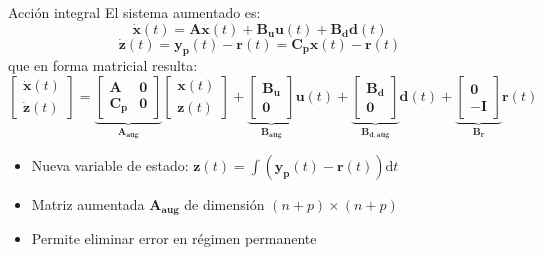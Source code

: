\documentclass{beamer}
\begin{document}
\begin{frame}{Acción integral}
    El sistema aumentado es:
    $$\mathbf{\dot{x}}(t) = \mathbf{A} \mathbf{x}(t) + \mathbf{B_u} \mathbf{u}(t) + \mathbf{B_d} \mathbf{d}(t)$$
    $$\dot{\mathbf{z}}(t) = \mathbf{y_p}(t) - \mathbf{r}(t) = \mathbf{C_p x}(t) - \mathbf{r}(t)$$
    que en forma matricial resulta:
        $$
    \begin{bmatrix}
    \mathbf{\dot{x}}(t) \\
    \dot{\mathbf{z}}(t)
    \end{bmatrix} = 
    \underbrace{\begin{bmatrix}
    \mathbf{A} & \mathbf{0} \\
    \mathbf{C_p} & \mathbf{0}
    \end{bmatrix}}_{\mathbf{A_{\text{aug}}}}
    \begin{bmatrix}
    \mathbf{x}(t) \\
    \mathbf{z}(t)
    \end{bmatrix} + 
    \underbrace{\begin{bmatrix}
    \mathbf{B_u} \\
    \mathbf{0}
    \end{bmatrix}}_{\mathbf{B_{\text{aug}}}}
    \mathbf{u}(t) + 
    \underbrace{\begin{bmatrix}
    \mathbf{B_d} \\
    \mathbf{0}
    \end{bmatrix}}_{\mathbf{B_{d,\text{aug}}}}
    \mathbf{d}(t) + 
    \underbrace{\begin{bmatrix}
    \mathbf{0} \\
    -\mathbf{I}
    \end{bmatrix}}_{\mathbf{B_{r}}}
    \mathbf{r}(t)
    $$
    
    \begin{itemize}
        \item Nueva variable de estado: $\mathbf{z}(t) = \int (\mathbf{y_p}(t) - \mathbf{r}(t)) \mathrm{d}t$
        \item Matriz aumentada $\mathbf{A_{\text{aug}}}$ de dimensión $(n+p)\times(n+p)$
        \item Permite eliminar error en régimen permanente
    \end{itemize}

\end{frame}
\end{document}
